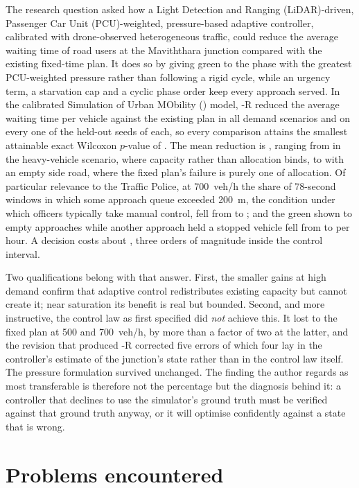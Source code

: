 The research question asked how a Light Detection and Ranging (LiDAR)-driven, Passenger Car Unit (PCU)-weighted, pressure-based adaptive controller, calibrated with drone-observed heterogeneous traffic, could reduce the average waiting time of road users at the Maviththara junction compared with the existing fixed-time plan. It does so by giving green to the phase with the greatest PCU-weighted pressure rather than following a rigid cycle, while an urgency term, a starvation cap and a cyclic phase order keep every approach served. In the calibrated Simulation of Urban MObility (\sumo{}) model, \prism{}-R reduced the average waiting time per vehicle against the existing plan in all  demand scenarios and on every one of the  held-out seeds of each, so every comparison attains the smallest attainable exact Wilcoxon $p$-value of . The mean reduction is , ranging from  in the heavy-vehicle scenario, where capacity rather than allocation binds, to  with an empty side road, where the fixed plan's failure is purely one of allocation. Of particular relevance to the Traffic Police, at 700~veh/h the share of 78-second windows in which some approach queue exceeded 200~m, the condition under which officers typically take manual control, fell from  to ; and the green shown to empty approaches while another approach held a stopped vehicle fell from  to  per hour. A decision costs about , three orders of magnitude inside the control interval.

Two qualifications belong with that answer. First, the smaller gains at high demand confirm that adaptive control redistributes existing capacity but cannot create it; near saturation its benefit is real but bounded. Second, and more instructive, the control law as first specified did \emph{not} achieve this. It lost to the fixed plan at 500 and 700~veh/h, by more than a factor of two at the latter, and the revision that produced \prism{}-R corrected five errors of which four lay in the controller's estimate of the junction's state rather than in the control law itself. The pressure formulation survived unchanged. The finding the author regards as most transferable is therefore not the percentage but the diagnosis behind it: a controller that declines to use the simulator's ground truth must be verified against that ground truth anyway, or it will optimise confidently against a state that is wrong.

\section{Problems encountered}\label{sec:conc-problems}

